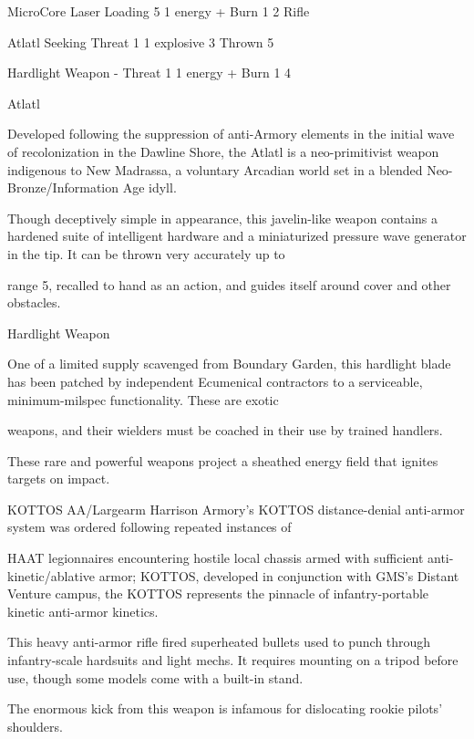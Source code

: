  MicroCore Laser          Loading                                  5                 1 energy + Burn 1       2 
 Rifle 

 Atlatl                   Seeking                                  Threat 1
         1 explosive             3 
                                                                   Thrown 5 

 Hardlight Weapon         -                                        Threat 1          1 energy + Burn 1       4 

Atlatl  

Developed following the suppression of anti-Armory elements in the initial wave of recolonization in the  
Dawline Shore, the Atlatl is a neo-primitivist weapon indigenous to New Madrassa, a voluntary Arcadian  
world set in a blended Neo-Bronze/Information Age idyll.   

Though deceptively simple in appearance, this javelin-like weapon contains a hardened suite of intelligent  
hardware and a miniaturized pressure wave generator in the tip. It can be thrown very accurately up to  

range 5, recalled to hand as an action, and guides itself around cover and other obstacles.
 

Hardlight Weapon  

One of a limited supply scavenged from Boundary Garden, this hardlight blade has been patched by  
independent Ecumenical contractors to a serviceable, minimum-milspec functionality. These are exotic  

weapons, and their wielders must be coached in their use by trained handlers.    

These rare and powerful weapons project a sheathed energy field that ignites targets on impact.
 

KOTTOS AA/Largearm  
Harrison Armory’s KOTTOS distance-denial anti-armor system was ordered following repeated instances of  

HAAT legionnaires encountering hostile local chassis armed with sufficient anti-kinetic/ablative armor;  
KOTTOS, developed in conjunction with GMS’s Distant Venture campus, the KOTTOS represents the  
pinnacle of infantry-portable kinetic anti-armor kinetics.    

This heavy anti-armor rifle fired superheated bullets used to punch through infantry-scale hardsuits and  
light mechs. It requires mounting on a tripod before use, though some models come with a built-in stand.  

The enormous kick from this weapon is infamous for dislocating rookie pilots’ shoulders.
 

